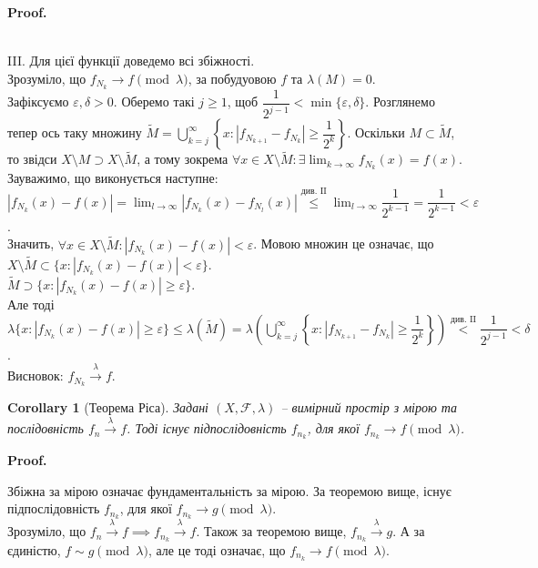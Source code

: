 \documentclass[a4paper, 10pt]{article}
\makeatletter
\theoremstyle{theoremdd}
\newtheorem{corollary}[theorem]{Corollary}
\newcommand\tomeasure[1]{\overset{{#1}}{\to}}
\renewenvironment{proof}[1][Proof.\\]{\par
\pushQED{\hfill \qed}%
\normalfont \topsep6\p@\@plus6\p@\relax
\trivlist
\item\relax
{\bfseries
#1\@addpunct{.}}\hspace\labelsep\ignorespaces
}{%
\popQED\endtrivlist\@endpefalse
}
\makeatother
\begin{document}
\begin{proof}
\bigskip \\
III. Для цієї функції доведемо всі збіжності.\\
Зрозуміло, що $f_{N_k} \to f \pmod \lambda$, за побудуовою $f$ та $\lambda(M) = 0$.\\
Зафіксуємо $\varepsilon, \delta > 0$. Оберемо такі $j \geq 1$, щоб $\dfrac{1}{2^{j-1}} < \min \{\varepsilon,\delta\}$. Розглянемо тепер ось таку множину $\tilde{M} = \displaystyle\bigcup_{k=j}^\infty \left\{ x: |f_{N_{k+1}} - f_{N_k}| \geq \dfrac{1}{2^k} \right\}$. Оскільки $M \subset \tilde{M}$, то звідси $X \setminus M \supset X \setminus \tilde{M}$, а тому зокрема $\forall x \in X \setminus \tilde{M}: \exists \displaystyle\lim_{k \to \infty} f_{N_k}(x) = f(x)$.\\
Зауважимо, що виконується наступне:\\
$|f_{N_k}(x) - f(x)| = \displaystyle\lim_{l \to \infty} |f_{N_k}(x) - f_{N_l}(x)| \overset{\text{див. II}}{\leq} \lim_{l \to \infty} \dfrac{1}{2^{k-1}} = \dfrac{1}{2^{k-1}} < \varepsilon$.\\
Значить, $\forall x \in X \setminus \tilde{M}: |f_{N_k}(x) - f(x)| < \varepsilon$. Мовою множин це означає, що \\
$X \setminus \tilde{M} \subset \{ x: |f_{N_k}(x) - f(x)| < \varepsilon\}$.\\
$\tilde{M} \supset \{x: |f_{N_k}(x) - f(x)| \geq \varepsilon\}$.\\
Але тоді $\displaystyle\lambda\{x: |f_{N_k}(x) - f(x)| \geq \varepsilon\} \leq \lambda(\tilde{M}) = \lambda\left( \bigcup_{k=j}^\infty \left\{ x: |f_{N_{k+1}} - f_{N_k}| \geq \dfrac{1}{2^k} \right\} \right) \overset{\text{див. II}}{<} \dfrac{1}{2^{j-1}} < \delta$.\\
Висновок: $f_{N_k} \tomeasure{\lambda} f$.
\end{proof}

\begin{corollary}[Теорема Ріса]
Задані $(X,\mathcal{F},\lambda)$ -- вимірний простір з мірою та послідовність $f_n \tomeasure{\lambda} f$. Тоді існує підпослідовність $f_{n_k}$, для якої $f_{n_k} \to f \pmod \lambda$.
\end{corollary}

\begin{proof}
Збіжна за мірою означає фундаментальність за мірою. За теоремою вище, існує підпослідовність $f_{n_k}$, для якої $f_{n_k} \to g \pmod \lambda$.\\
Зрозуміло, що $f_n \tomeasure{\lambda} f \implies f_{n_k} \tomeasure{\lambda} f$. Також за теоремою вище, $f_{n_k} \tomeasure{\lambda} g$. А за єдиністю, $f \sim g \pmod \lambda$, але це тоді означає, що $f_{n_k} \to f \pmod \lambda$.
\end{proof}
\end{document}
